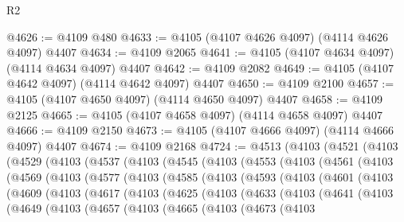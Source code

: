 \begin{lexlean}{R2}
\begin{coremodule}
@4626 := @4109 @480
@4633 := @4105 (@4107 @4626 @4097) (@4114 @4626 @4097) @4407
@4634 := @4109 @2065
@4641 := @4105 (@4107 @4634 @4097) (@4114 @4634 @4097) @4407
@4642 := @4109 @2082
@4649 := @4105 (@4107 @4642 @4097) (@4114 @4642 @4097) @4407
@4650 := @4109 @2100
@4657 := @4105 (@4107 @4650 @4097) (@4114 @4650 @4097) @4407
@4658 := @4109 @2125
@4665 := @4105 (@4107 @4658 @4097) (@4114 @4658 @4097) @4407
@4666 := @4109 @2150
@4673 := @4105 (@4107 @4666 @4097) (@4114 @4666 @4097) @4407
@4674 := @4109 @2168
@4724 := @4513
    (@4103
      (@4521
        (@4103
          (@4529
            (@4103
              (@4537
                (@4103
                  (@4545
                    (@4103
                      (@4553
                        (@4103
                          (@4561
                            (@4103
                              (@4569
                                (@4103
                                  (@4577
                                    (@4103
                                      (@4585
                                        (@4103
                                          (@4593
                                            (@4103
                                              (@4601
                                                (@4103
                                                  (@4609
                                                    (@4103
                                                      (@4617
                                                        (@4103
                                                          (@4625
                                                            (@4103
                                                              (@4633
                                                                (@4103
                                                                  (@4641
                                                                    (@4103
                                                                      (@4649
                                                                        (@4103
                                                                          (@4657
                                                                            (@4103
                                                                              (@4665
                                                                                (@4103
                                                                                  (@4673
                                                                                    (@4103

\end{coremodule}
\end{lexlean}
